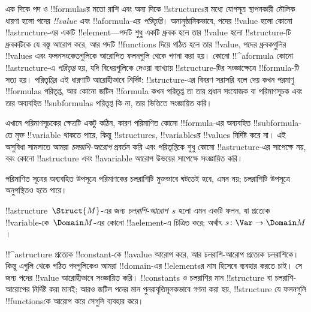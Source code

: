 \documentclass[../../../include/open-logic-section]{subfiles}
\begin{document}


\begin{explain}
এক দিকে পদ ও !!{formula}sর মতো রাশি এবং অন্য দিকে !!{structure}sর
মধ্যে যোগসূত্র স্থাপনকারী মৌলিক ধারণা হলো পদের \emph{!!{value}} এবং
!!a{formula}-এর \emph{পরিতৃপ্তি}। অনানুষ্ঠানিকভাবে, পদের !!{value}
হলো কোনো !!a{structure}-এর একটি !!{element}—পদটি শুধু একটি ধ্রুবক হলে
তার !!{value} হলো !!{structure}-টি ধ্রুবকটিকে যে বস্তু আরোপ করে, আর
পদটি !!{function}s দিয়ে গঠিত হলে তার !!{value}, পদের ধ্রুবকগুলির
!!{value}s এবং ফলনসংকেতগুলিকে আরোপিত ফলনগুলি থেকে গণনা করা হয়। কোনো
!!^a{formula} কোনো !!a{structure}-এ \emph{পরিতৃপ্ত} হয়, যদি
বিধেয়গুলিকে দেওয়া ব্যাখ্যায় !!{structure}-টির সংজ্ঞাক্ষেত্রে
!!{formula}-টি সত্য হয়। পরিতৃপ্তির এই ধারণাটি আরোহীভাবে নির্দিষ্ট:
!!{structure}-এর বিবরণ সরাসরি বলে দেয় কখন পরমাণু !!{formula}s
পরিতৃপ্ত, আর কোনো জটিল !!{formula} কখন পরিতৃপ্ত তা তার প্রধান সংযোজক
বা পরিমাণসূচক এবং তার অব্যবহিত !!{subformula}s পরিতৃপ্ত কি না, তার
ভিত্তিতে সংজ্ঞায়িত করি।

এখানে পরিমাণসূচকের ক্ষেত্রটি একটু কঠিন, কারণ পরিমাণিত কোনো
!!{formula}-এর অব্যবহিত !!{subformula}-তে মুক্ত !!{variable} থাকতে পারে,
কিন্তু !!{structure}s, !!{variable}sর !!{value}s নির্দিষ্ট করে না।
এই অসুবিধা সামলাতে আমরা \emph{চলরাশি-আরোপ} প্রবর্তন করি এবং পরিতৃপ্তিকে
শুধু কোনো !!a{structure}-এর সাপেক্ষে নয়, বরং কোনো !!a{structure} এবং
!!a{variable} আরোপ উভয়ের সাপেক্ষে সংজ্ঞায়িত করি।
\end{explain}


\par\smallskip\noindent পরিমাণিত সূত্রের অব্যবহিত উপসূত্রে পরিমাণকের চলরাশিটি মুক্তভাবে ঘটতেই হবে, এমন নয়; চলরাশিটি উপসূত্রে অনুপস্থিতও হতে পারে।

\begin{defn}[চলরাশি-আরোপ]
!!a{structure}~$\Struct{M}$-এর জন্য \emph{চলরাশি-আরোপ}~$s$ হলো এমন
একটি ফলন, যা প্রত্যেক !!{variable}-কে~$\Domain M$-এর কোনো
!!a{element}-এ চিত্রিত করে; অর্থাৎ $s\colon \Var \to \Domain M$।
\end{defn}

\begin{explain}
!!^a{structure} প্রত্যেক !!{constant}-কে !!a{value} আরোপ করে, আর
চলরাশি-আরোপ প্রত্যেক চলরাশিকে। কিন্তু এগুলি থেকে গঠিত পদগুলিকেও আমরা
!!{domain}-এর !!{element}sর নাম হিসেবে ব্যবহার করতে চাই। সে জন্য
পদের !!{value} আরোহীভাবে সংজ্ঞায়িত করি। !!{constant}s ও চলরাশির মান
!!{structure} বা চলরাশি-আরোপের নির্দিষ্ট করা মানই; আরও জটিল পদের মান
পুনরাবৃত্তিমূলকভাবে গণনা করা হয়, !!{structure} যে ফলনগুলি
!!{function}sকে আরোপ করে সেগুলি ব্যবহার করে।
\end{explain}
\end{document}
